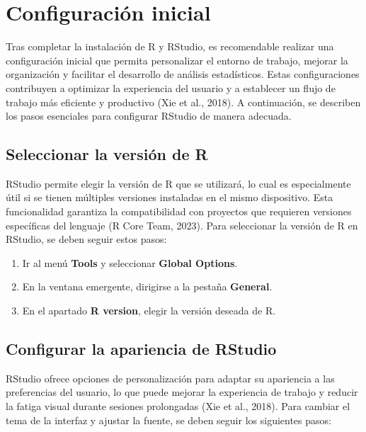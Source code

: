 \documentclass[
  spanish,
  a4paper,
  DIV=11,
  numbers=noendperiod,
  onepage,
  openany]{scrreprt}
\begin{document}
\section{Configuración inicial}\label{configuraciuxf3n-inicial}

Tras completar la instalación de R y RStudio, es recomendable realizar
una configuración inicial que permita personalizar el entorno de
trabajo, mejorar la organización y facilitar el desarrollo de análisis
estadísticos. Estas configuraciones contribuyen a optimizar la
experiencia del usuario y a establecer un flujo de trabajo más eficiente
y productivo (Xie et al., 2018). A continuación, se describen los pasos
esenciales para configurar RStudio de manera adecuada.

\subsection{Seleccionar la versión de
R}\label{seleccionar-la-versiuxf3n-de-r}

RStudio permite elegir la versión de R que se utilizará, lo cual es
especialmente útil si se tienen múltiples versiones instaladas en el
mismo dispositivo. Esta funcionalidad garantiza la compatibilidad con
proyectos que requieren versiones específicas del lenguaje (R Core Team,
2023). Para seleccionar la versión de R en RStudio, se deben seguir
estos pasos:

\begin{enumerate}
\def\labelenumi{\arabic{enumi}.}
\item
  Ir al menú \textbf{Tools} y seleccionar \textbf{Global Options}.
\item
  En la ventana emergente, dirigirse a la pestaña \textbf{General}.
\item
  En el apartado \textbf{R version}, elegir la versión deseada de R.
\end{enumerate}

\subsection{Configurar la apariencia de
RStudio}\label{configurar-la-apariencia-de-rstudio}

RStudio ofrece opciones de personalización para adaptar su apariencia a
las preferencias del usuario, lo que puede mejorar la experiencia de
trabajo y reducir la fatiga visual durante sesiones prolongadas (Xie et
al., 2018). Para cambiar el tema de la interfaz y ajustar la fuente, se
deben seguir los siguientes pasos:
\end{document}
